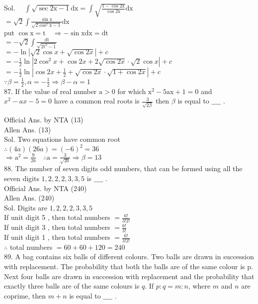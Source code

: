 \documentclass[10pt]{article}
\begin{document}
Sol. \(\quad \int \sqrt{\sec 2 \mathrm{x}-1} \mathrm{dx}=\int \sqrt{\frac{1-\cos 2 \mathrm{x}}{\cos 2 \mathrm{x}}} \mathrm{dx}\)\\
\(=\sqrt{2} \int \frac{\sin \mathrm{x}}{\sqrt{2 \cos ^{2} \mathrm{x}-1}} \mathrm{dx}\)\\
put \(\cos \mathrm{x}=\mathrm{t} \quad \Rightarrow-\sin \mathrm{xdx}=\mathrm{dt}\)\\
\(=-\sqrt{2} \int \frac{\mathrm{dt}}{\sqrt{2 \mathrm{t}^{2}-1}}\)\\
\(=-\ln |\sqrt{2} \cos x+\sqrt{\cos 2 x}|+c\)\\
\(=-\frac{1}{2} \ln \left|2 \cos ^{2} x+\cos 2 x+2 \sqrt{\cos 2 x} \cdot \sqrt{2} \cos x\right|+c\)\\
\(=-\frac{1}{2} \ln \left|\cos 2 x+\frac{1}{2}+\sqrt{\cos 2 x} \cdot \sqrt{1+\cos 2 x}\right|+c\)\\
\(\because \beta=\frac{1}{2}, \alpha=-\frac{1}{2} \Rightarrow \beta-\alpha=1\)\\
87. If the value of real number \(\mathrm{a}>0\) for which \(\mathrm{x}^{2}-5 \mathrm{ax} +1=0\) and \(x^{2}-a x-5=0\) have a common real roots is \(\frac{3}{\sqrt{2 \beta}}\) then \(\beta\) is equal to \(\_\_\_\_\) .

Official Ans. by NTA (13)\\
Allen Ans. (13)\\
Sol. Two equations have common root\\
\(\therefore(4 a)(26 a)=(-6)^{2}=36\)\\
\(\Rightarrow \mathrm{a}^{2}=\frac{9}{26} \quad \therefore \mathrm{a}=\frac{3}{\sqrt{26}} \Rightarrow \beta=13\)\\
88. The number of seven digits odd numbers, that can be formed using all the seven digits \(1,2,2,2,3,3,5\) is \(\_\_\_\_\) .\\
Official Ans. by NTA (240)\\
Allen Ans. (240)\\
Sol. Digits are \(1,2,2,2,3,3,5\)\\
If unit digit 5 , then total numbers \(=\frac{6!}{3!2!}\)\\
If unit digit 3 , then total numbers \(=\frac{6!}{3!}\)\\
If unit digit 1 , then total numbers \(=\frac{6!}{3!2!}\)\\
\(\therefore\) total numbers \(=60+60+120=240\)\\
89. A bag contains six balls of different colours. Two balls are drawn in succession with replacement. The probability that both the balls are of the same colour is p. Next four balls are drawn in succession with replacement and the probability that exactly three balls are of the same colours is \(q\). If \(p: q=m : n\), where \(m\) and \(n\) are coprime, then \(m+n\) is equal to \(\_\_\_\_\) .
\end{document}
